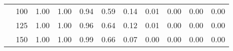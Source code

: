 \begin{table}[t]
\begin{center}
\begin{subtable}[c]{\textwidth}
\begin{center}
\begin{tabular}{rcccccccccc}
                                        & \multicolumn{1}{c|}{100}  & \num{1.00}  & \num{1.00}  & \num{0.94}  & \num{0.59}  & \num{0.14}  & \num{0.01}  & \num{0.00}  & \num{0.00}  & \num{0.00}  \\
                                        & \multicolumn{1}{c|}{125}  & \num{1.00}  & \num{1.00}  & \num{0.96}  & \num{0.64}  & \num{0.12}  & \num{0.01}  & \num{0.00}  & \num{0.00}  & \num{0.00}  \\
                                        & \multicolumn{1}{c|}{150}  & \num{1.00}  & \num{1.00}  & \num{0.99}  & \num{0.66}  & \num{0.07}  & \num{0.00}  & \num{0.00}  & \num{0.00}  & \num{0.00}  \\
                                    \end{tabular}
            \end{center}
        \end{subtable}

        \vspace{5mm}


\end{center}
\end{table}
